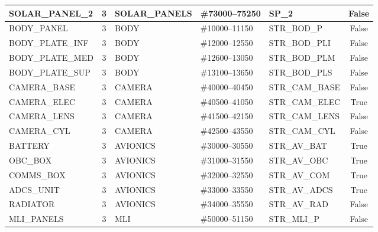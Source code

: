 \begin{table}[H]
\begin{tabularx}{\textwidth}{
        |>{\raggedright\arraybackslash}X
        |c
        |>{\raggedright\arraybackslash}X
        |l
        |>{\raggedright\arraybackslash}X
        |c|
    }
        SOLAR\_PANEL\_2
        & 3 & SOLAR\_PANELS
        & \#73000--75250
        & SP\_2
        & False \\
        \hline

        BODY\_PANEL
        & 3 & BODY
        & \#10000--11150
        & STR\_BOD\_P
        & False \\
        \hline

        BODY\_PLATE\_INF
        & 3 & BODY
        & \#12000--12550
        & STR\_BOD\_PLI
        & False \\
        \hline

        BODY\_PLATE\_MED
        & 3 & BODY
        & \#12600--13050
        & STR\_BOD\_PLM
        & False \\
        \hline

        BODY\_PLATE\_SUP
        & 3 & BODY
        & \#13100--13650
        & STR\_BOD\_PLS
        & False \\
        \hline

        CAMERA\_BASE
        & 3 & CAMERA
        & \#40000--40450
        & STR\_CAM\_BASE
        & False \\
        \hline

        CAMERA\_ELEC
        & 3 & CAMERA
        & \#40500--41050
        & STR\_CAM\_ELEC
        & True \\
        \hline

        CAMERA\_LENS
        & 3 & CAMERA
        & \#41500--42150
        & STR\_CAM\_LENS
        & False \\
        \hline

        CAMERA\_CYL
        & 3 & CAMERA
        & \#42500--43550
        & STR\_CAM\_CYL
        & False \\
        \hline

        BATTERY
        & 3 & AVIONICS
        & \#30000--30550
        & STR\_AV\_BAT
        & True \\
        \hline

        OBC\_BOX
        & 3 & AVIONICS
        & \#31000--31550
        & STR\_AV\_OBC
        & True \\
        \hline

        COMMS\_BOX
        & 3 & AVIONICS
        & \#32000--32550
        & STR\_AV\_COM
        & True \\
        \hline

        ADCS\_UNIT
        & 3 & AVIONICS
        & \#33000--33550
        & STR\_AV\_ADCS
        & True \\
        \hline

        RADIATOR
        & 3 & AVIONICS
        & \#34000--35550
        & STR\_AV\_RAD
        & False \\
        \hline

        MLI\_PANELS
        & 3 & MLI
        & \#50000--51150
        & STR\_MLI\_P
        & False \\
        \hline
    \end{tabularx}
\end{table}